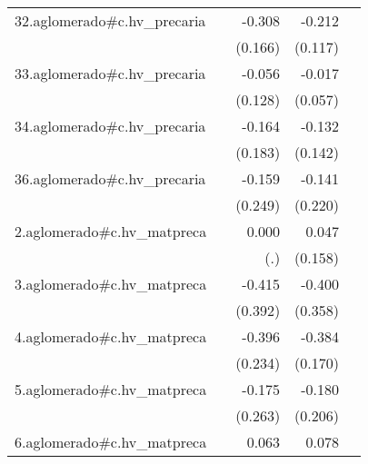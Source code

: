 {\begin{longtable}{l*{4}{D{.}{.}{-1}}}
\addlinespace
32.aglomerado#c.hv\_precaria&                     &      -0.308         &      -0.212         &                     \\
            &                     &     (0.166)         &     (0.117)         &                     \\
\addlinespace
33.aglomerado#c.hv\_precaria&                     &      -0.056         &      -0.017         &                     \\
            &                     &     (0.128)         &     (0.057)         &                     \\
\addlinespace
34.aglomerado#c.hv\_precaria&                     &      -0.164         &      -0.132         &                     \\
            &                     &     (0.183)         &     (0.142)         &                     \\
\addlinespace
36.aglomerado#c.hv\_precaria&                     &      -0.159         &      -0.141         &                     \\
            &                     &     (0.249)         &     (0.220)         &                     \\
\addlinespace
2.aglomerado#c.hv\_matpreca&                     &       0.000         &       0.047         &                     \\
            &                     &         (.)         &     (0.158)         &                     \\
\addlinespace
3.aglomerado#c.hv\_matpreca&                     &      -0.415         &      -0.400         &                     \\
            &                     &     (0.392)         &     (0.358)         &                     \\
\addlinespace
4.aglomerado#c.hv\_matpreca&                     &      -0.396         &      -0.384\sym{*}  &                     \\
            &                     &     (0.234)         &     (0.170)         &                     \\
\addlinespace
5.aglomerado#c.hv\_matpreca&                     &      -0.175         &      -0.180         &                     \\
            &                     &     (0.263)         &     (0.206)         &                     \\
\addlinespace
6.aglomerado#c.hv\_matpreca&                     &       0.063         &       0.078         &                     \\

\end{longtable}}
